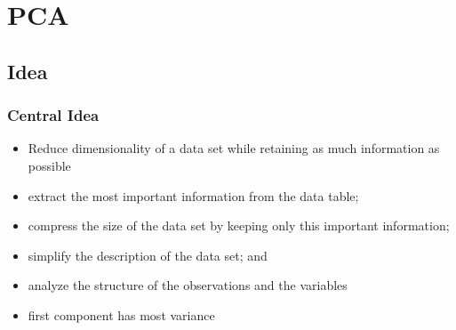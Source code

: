 \documentclass{beamer}
\theoremstyle{plain}
\theoremstyle{definition}
\begin{document}

\section{PCA} 
\subsection{Idea}
\begin{frame}\frametitle{Central Idea}
\begin{itemize}
\item Reduce dimensionality of a data set while retaining as much information as possible
\item extract the most important information from the data table;
\item compress the size of the data set by keeping only this important information;
\item simplify the description of the data set; and
\item analyze the structure of the observations and the variables
\item first component has most variance 
\end{itemize} 
\end{frame}
\end{document}
